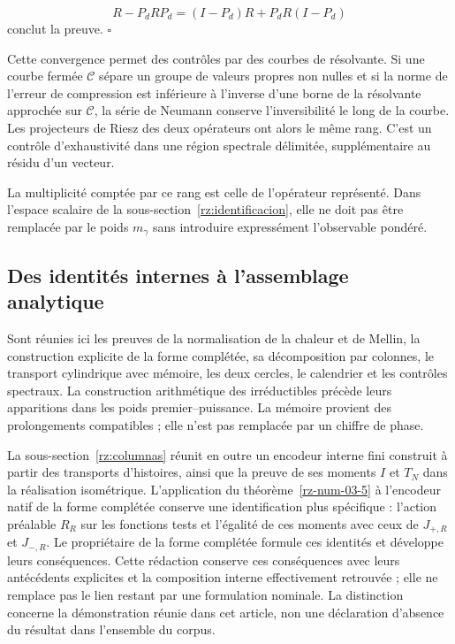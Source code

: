 \[
R-P_dRP_d=(I-P_d)R+P_dR(I-P_d)
\]
conclut la preuve. \hfill\(\square\)

Cette convergence permet des contrôles par des courbes de résolvante. Si une courbe fermée \(\mathcal C\) sépare un groupe de valeurs propres non nulles et si la norme de l’erreur de compression est inférieure à l’inverse d’une borne de la résolvante approchée sur \(\mathcal C\), la série de Neumann conserve l’inversibilité le long de la courbe. Les projecteurs de Riesz des deux opérateurs ont alors le même rang. C’est un contrôle d’exhaustivité dans une région spectrale délimitée, supplémentaire au résidu d’un vecteur.

La multiplicité comptée par ce rang est celle de l'opérateur représenté. Dans l'espace scalaire de la sous-section~\ref{rz:identificacion}, elle ne doit pas être remplacée par le poids \(m_\gamma\) sans introduire expressément l'observable pondéré.

\subsection{Des identités internes à l’assemblage analytique}
\label{rz:alcance}
Sont réunies ici les preuves de la normalisation de la chaleur et de Mellin, la construction explicite de la forme complétée, sa décomposition par colonnes, le transport cylindrique avec mémoire, les deux cercles, le calendrier et les contrôles spectraux. La construction arithmétique des irréductibles précède leurs apparitions dans les poids premier–puissance. La mémoire provient des prolongements compatibles ; elle n'est pas remplacée par un chiffre de phase.

La sous-section~\ref{rz:columnas} réunit en outre un encodeur interne fini construit à partir des transports d’histoires, ainsi que la preuve de ses moments \(I\) et \(T_N\) dans la réalisation isométrique. L’application du théorème~\ref{rz-num-03-5} à l’encodeur natif de la forme complétée conserve une identification plus spécifique : l’action préalable \(R_R\) sur les fonctions tests et l’égalité de ces moments avec ceux de \(J_{+,R}\) et \(J_{-,R}\). Le propriétaire de la forme complétée formule ces identités et développe leurs conséquences. Cette rédaction conserve ces conséquences avec leurs antécédents explicites et la composition interne effectivement retrouvée ; elle ne remplace pas le lien restant par une formulation nominale. La distinction concerne la démonstration réunie dans cet article, non une déclaration d’absence du résultat dans l’ensemble du corpus.

